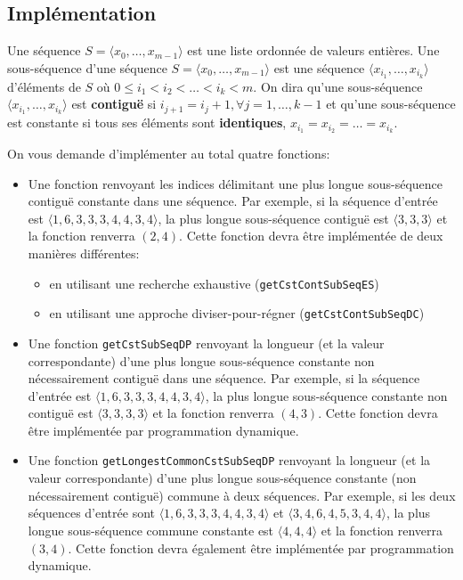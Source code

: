 \documentclass[a4paper,10pt]{article}
\begin{document}
\subsection*{Implémentation}

Une séquence $S=\langle x_0,\ldots,x_{m-1}\rangle$ est une liste
ordonnée de valeurs entières. Une sous-séquence d'une séquence
$S=\langle x_0,\ldots,x_{m-1}\rangle$ est une séquence $\langle
x_{i_1},\ldots,x_{i_k}\rangle$ d'éléments de $S$ où $0\leq i_1<i_2<\ldots<i_k<m$. On
dira qu'une sous-séquence $\langle x_{i_1},\ldots,x_{i_k}\rangle$ est
{\bf contiguë} si $i_{j+1}=i_{j}+1, \forall j=1,\ldots,k-1$ et qu'une
sous-séquence est constante si tous ses éléments sont {\bf identiques},
$x_{i_1}=x_{i_2}=\ldots=x_{i_k}$.

On vous demande d'implémenter au total quatre fonctions:

\begin{itemize}
\item Une fonction renvoyant les indices délimitant une plus longue
  sous-séquence contiguë constante dans une séquence. Par exemple, si
  la séquence d'entrée est $\langle 1,6,3,3,3,4,4,3,4\rangle$, la plus
  longue sous-séquence contiguë est $\langle 3,3,3\rangle$ et la
  fonction renverra $(2,4)$. Cette fonction devra être implémentée de
  deux manières différentes:
\begin{itemize}
\item en utilisant une recherche exhaustive (\texttt{getCstContSubSeqES})
\item en utilisant une approche diviser-pour-régner (\texttt{getCstContSubSeqDC})
\end{itemize}

\item Une fonction \texttt{getCstSubSeqDP} renvoyant la longueur (et la valeur correspondante)
  d'une plus longue sous-séquence constante non nécessairement
  contiguë dans une séquence. Par exemple, si la séquence d'entrée est
  $\langle 1,6,3,3,3,4,4,3,4\rangle$, la plus longue sous-séquence
  constante non contiguë est $\langle 3,3,3,3\rangle$ et la fonction
  renverra $(4,3)$. Cette fonction devra être implémentée par
 programmation dynamique.

\item Une fonction \texttt{getLongestCommonCstSubSeqDP} renvoyant la longueur (et la valeur correspondante)
  d'une plus longue sous-séquence constante (non nécessairement
  contiguë) commune à deux séquences. Par exemple, si les deux
  séquences d'entrée sont $\langle 1,6,3,3,3,4,4,3,4\rangle$ et
  $\langle 3,4,6,4,5,3,4,4\rangle$, la plus longue sous-séquence
  commune constante est $\langle 4,4,4 \rangle$ et la fonction
  renverra $(3,4)$. Cette fonction devra également être implémentée
  par programmation dynamique.
\end{itemize}
\end{document}
